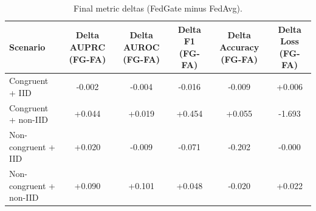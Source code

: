 \begin{table}[t]
\centering
\caption{Final metric deltas (FedGate minus FedAvg).}
\label{tab:paper_delta_final}
\begin{tabular}{lccccc}
\toprule
Scenario & Delta AUPRC (FG-FA) & Delta AUROC (FG-FA) & Delta F1 (FG-FA) & Delta Accuracy (FG-FA) & Delta Loss (FG-FA) \\
\midrule
Congruent + IID & -0.002 & -0.004 & -0.016 & -0.009 & +0.006 \\
Congruent + non-IID & +0.044 & +0.019 & +0.454 & +0.055 & -1.693 \\
Non-congruent + IID & +0.020 & -0.009 & -0.071 & -0.202 & -0.000 \\
Non-congruent + non-IID & +0.090 & +0.101 & +0.048 & -0.020 & +0.022 \\
\bottomrule
\end{tabular}
\end{table}
